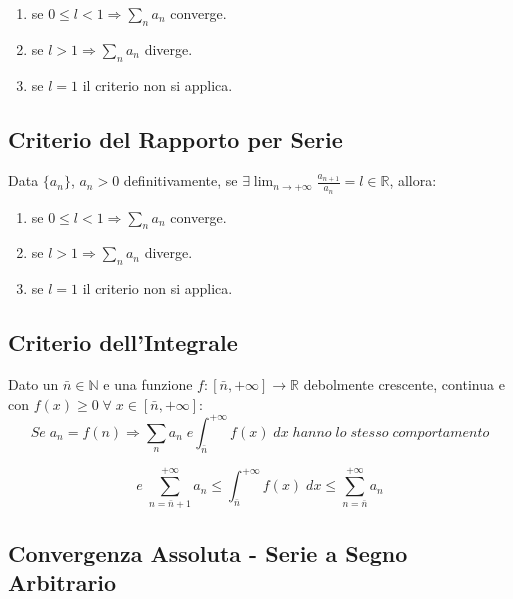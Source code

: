 \documentclass{article}
\begin{document}
\begin{enumerate}
    \item se $0 \leq l < 1 \Rightarrow \displaystyle \sum_n a_n$ converge.
    \item se $l > 1 \Rightarrow \displaystyle \sum_n a_n$ diverge.
    \item se $l = 1$ il criterio non si applica.
\end{enumerate}

\subsection{Criterio del Rapporto per Serie}

Data $\{a_n\}$, $a_n > 0$ definitivamente, se $\exists \displaystyle \lim_{n \to + \infty} \frac{a_{n+1}}{a_n} = l \in \mathbb{R}$, allora:

\begin{enumerate}
    \item se $0 \leq l < 1 \Rightarrow \displaystyle \sum_n a_n$ converge.
    \item se $l > 1 \Rightarrow \displaystyle \sum_n a_n$ diverge.
    \item se $l = 1$ il criterio non si applica.
\end{enumerate}

\subsection{Criterio dell'Integrale}

Dato un $\bar{n} \in \mathbb{N}$ e una funzione $f: [\bar{n}, + \infty] \to \mathbb{R}$ debolmente crescente, continua e con $f(x) \geq 0 \; \forall \; x \in [\bar{n}, + \infty]$: \\

\begin{equation*}
    \displaystyle Se \; a_n = f(n) \Rightarrow \sum_n a_n \; e \int_{\bar{n}}^{+ \infty} f(x) \; dx \; hanno \; lo \; stesso \; comportamento
\end{equation*}

\begin{equation*}
    e \; \sum_{n=\bar{n}+1}^{+ \infty} a_n \leq \int_{\bar{n}}^{+ \infty} f(x) \; dx \leq \sum_{n=\bar{n}}^{+ \infty} a_n
\end{equation*}

\subsection{Convergenza Assoluta - Serie a Segno Arbitrario}
\end{document}
